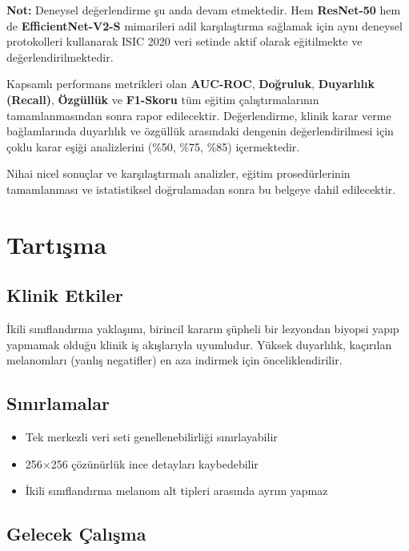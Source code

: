 \documentclass[12pt,a4paper]{article}
\begin{document}
\textbf{Not:} Deneysel değerlendirme şu anda devam etmektedir. Hem \textbf{ResNet-50} hem de \textbf{EfficientNet-V2-S} mimarileri adil karşılaştırma sağlamak için aynı deneysel protokolleri kullanarak ISIC 2020 veri setinde aktif olarak eğitilmekte ve değerlendirilmektedir.

Kapsamlı performans metrikleri olan \textbf{AUC-ROC}, \textbf{Doğruluk}, \textbf{Duyarlılık (Recall)}, \textbf{Özgüllük} ve \textbf{F1-Skoru} tüm eğitim çalıştırmalarının tamamlanmasından sonra rapor edilecektir. Değerlendirme, klinik karar verme bağlamlarında duyarlılık ve özgüllük arasındaki dengenin değerlendirilmesi için çoklu karar eşiği analizlerini (\%50, \%75, \%85) içermektedir.

Nihai nicel sonuçlar ve karşılaştırmalı analizler, eğitim prosedürlerinin tamamlanması ve istatistiksel doğrulamadan sonra bu belgeye dahil edilecektir.

\section{Tartışma}
\label{sec:discussion}

\subsection{Klinik Etkiler}

İkili sınıflandırma yaklaşımı, birincil kararın şüpheli bir lezyondan biyopsi yapıp yapmamak olduğu klinik iş akışlarıyla uyumludur. Yüksek duyarlılık, kaçırılan melanomları (yanlış negatifler) en aza indirmek için önceliklendirilir.

\subsection{Sınırlamalar}

\begin{itemize}
    \item Tek merkezli veri seti genellenebilirliği sınırlayabilir
    \item 256$\times$256 çözünürlük ince detayları kaybedebilir
    \item İkili sınıflandırma melanom alt tipleri arasında ayrım yapmaz
\end{itemize}

\subsection{Gelecek Çalışma}
\end{document}
